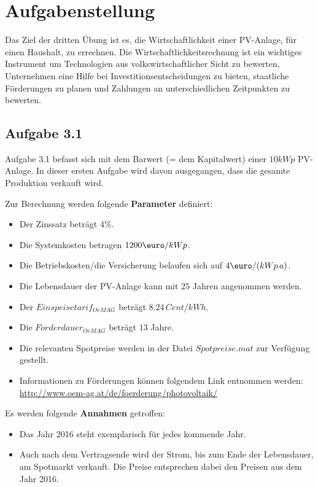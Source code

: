 \documentclass[a4paper,12pt]{article}
\begin{document}
	

	\newpage
	\tableofcontents

	\newpage
	\section{Aufgabenstellung}
	\label{sec:Aufgabenstellung}
	Das Ziel der dritten Übung ist es, die Wirtschaftlichkeit einer PV-Anlage, für einen Haushalt, zu errechnen.\newline
	Die Wirtschaftlichkeitsrechnung ist ein wichtiges Instrument um Technologien aus volkswirtschaftlicher Sicht zu bewerten,
	Unternehmen eine Hilfe bei Investitionsentscheidungen zu bieten, staatliche Förderungen zu planen und Zahlungen an unterschiedlichen Zeitpunkten zu bewerten.
	\subsection{Aufgabe 3.1}
	Aufgabe 3.1 befasst sich mit dem Barwert (= dem Kapitalwert) einer $10kWp$ PV-Anlage.\newline
	In dieser ersten Aufgabe wird davon ausgegangen, dass die gesamte Produktion verkauft wird.\\ \par
	\noindent Zur Berechnung werden folgende \textbf{Parameter} definiert:
	\begin{itemize}
		\item Der Zinssatz beträgt $4\%$.
		\item Die Systemkosten betragen $1200\mbox{\euro}/kWp$.
		\item Die Betriebskosten/die Versicherung belaufen sich auf $4\mbox{\euro}/(kWp\,a)$.
		\item Die Lebensdauer der PV-Anlage kann mit $25$ Jahren angenommen werden.
		\item Der $Einspeisetarif_{OeMAG}$ beträgt $8.24\,Cent/kWh$.
		\item Die $F\ddot{o}rderdauer_{OeMAG}$ beträgt $13$ Jahre.
		\item Die relevanten Spotpreise werden in der Datei $Spotpreise.mat$ zur Verfügung gestellt.
		\item Informationen zu Förderungen können folgendem Link entnommen werden:\newline
		\url{http://www.oem-ag.at/de/foerderung/photovoltaik/}
	\end{itemize}
	Es werden folgende \textbf{Annahmen} getroffen:
	\begin{itemize}
		\item Das Jahr 2016 steht exemplarisch für jedes kommende Jahr.
		\item Auch nach dem Vertragsende wird der Strom, bis zum Ende der Lebensdauer, am Spotmarkt verkauft. Die Preise entsprechen dabei den Preisen aus dem Jahr 2016.
	\end{itemize}
\end{document}

